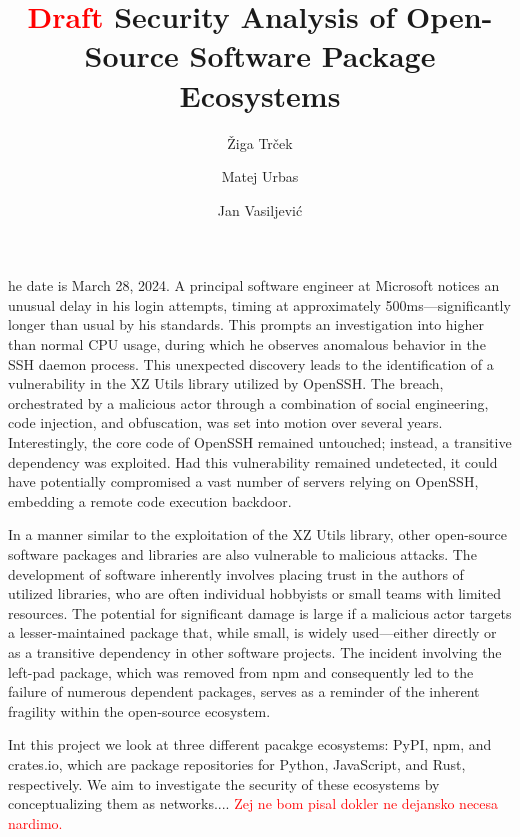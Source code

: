 \documentclass[9pt,twocolumn,twoside]{pnas-report}
\title{\textcolor{red}{Draft} Security Analysis of Open-Source Software Package Ecosystems}
\author[a]{Žiga Trček}
\author[a]{Matej Urbas}
\author[a]{Jan Vasiljević}
\affil[a]{University of Ljubljana, Faculty of Computer and Information Science, Ve\v{c}na pot 113, SI-1000 Ljubljana, Slovenia}
\begin{document}
\maketitle
\thispagestyle{firststyle}

he date is March 28, 2024. A principal software engineer at Microsoft notices an unusual delay in his login attempts, timing at approximately 500ms—significantly longer than usual by his standards. This prompts an investigation into higher than normal CPU usage, during which he observes anomalous behavior in the SSH daemon process. This unexpected discovery leads to the identification of a vulnerability in the XZ Utils library utilized by OpenSSH. The breach, orchestrated by a malicious actor through a combination of social engineering, code injection, and obfuscation, was set into motion over several years. Interestingly, the core code of OpenSSH remained untouched; instead, a transitive dependency was exploited. Had this vulnerability remained undetected, it could have potentially compromised a vast number of servers relying on OpenSSH, embedding a remote code execution backdoor.

In a manner similar to the exploitation of the XZ Utils library, other open-source software packages and libraries are also vulnerable to malicious attacks.
The development of software inherently involves placing trust in the authors of utilized libraries, who are often individual hobbyists or small teams with limited resources.
The potential for significant damage is large if a malicious actor targets a lesser-maintained package that, while small, is widely used—either directly or as a transitive dependency in other software projects.
The incident involving the left-pad package, which was removed from npm and consequently led to the failure of numerous dependent packages, serves as a reminder of the inherent fragility within the open-source ecosystem.

Int this project we look at three different pacakge ecosystems: PyPI, npm, and crates.io, which are package repositories for Python, JavaScript, and Rust, respectively. We aim to investigate the security of these ecosystems by conceptualizing them as networks.... \textcolor{red}{Zej ne bom pisal dokler ne dejansko necesa nardimo.}

\end{document}
